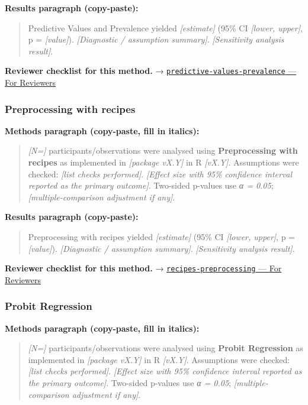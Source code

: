 \documentclass[
]{article}
\begin{document}
\textbf{Results paragraph (copy-paste):}

\begin{quote}
Predictive Values and Prevalence yielded \emph{{[}estimate{]}} (95\% CI
\emph{{[}lower, upper{]}}, p = \emph{{[}value{]}}). \emph{{[}Diagnostic
/ assumption summary{]}}. \emph{{[}Sensitivity analysis result{]}}.
\end{quote}

\textbf{Reviewer checklist for this method.} →
\href{../chapters/14-clinical/predictive-values-prevalence.Rmd\#for-reviewers}{\texttt{predictive-values-prevalence}
--- For Reviewers}

\subsubsection{Preprocessing with
recipes}\label{preprocessing-with-recipes}

\textbf{Methods paragraph (copy-paste, fill in italics):}

\begin{quote}
\emph{{[}N={]}} participants/observations were analysed using
\textbf{Preprocessing with recipes} as implemented in \emph{{[}package
vX.Y{]}} in R \emph{{[}vX.Y{]}}. Assumptions were checked: \emph{{[}list
checks performed{]}}. \emph{{[}Effect size with 95\% confidence interval
reported as the primary outcome{]}}. Two-sided p-values use \emph{α =
0.05}; \emph{{[}multiple-comparison adjustment if any{]}}.
\end{quote}

\textbf{Results paragraph (copy-paste):}

\begin{quote}
Preprocessing with recipes yielded \emph{{[}estimate{]}} (95\% CI
\emph{{[}lower, upper{]}}, p = \emph{{[}value{]}}). \emph{{[}Diagnostic
/ assumption summary{]}}. \emph{{[}Sensitivity analysis result{]}}.
\end{quote}

\textbf{Reviewer checklist for this method.} →
\href{../chapters/13-ml/recipes-preprocessing.Rmd\#for-reviewers}{\texttt{recipes-preprocessing}
--- For Reviewers}

\subsubsection{Probit Regression}\label{probit-regression}

\textbf{Methods paragraph (copy-paste, fill in italics):}

\begin{quote}
\emph{{[}N={]}} participants/observations were analysed using
\textbf{Probit Regression} as implemented in \emph{{[}package vX.Y{]}}
in R \emph{{[}vX.Y{]}}. Assumptions were checked: \emph{{[}list checks
performed{]}}. \emph{{[}Effect size with 95\% confidence interval
reported as the primary outcome{]}}. Two-sided p-values use \emph{α =
0.05}; \emph{{[}multiple-comparison adjustment if any{]}}.
\end{quote}
\end{document}

